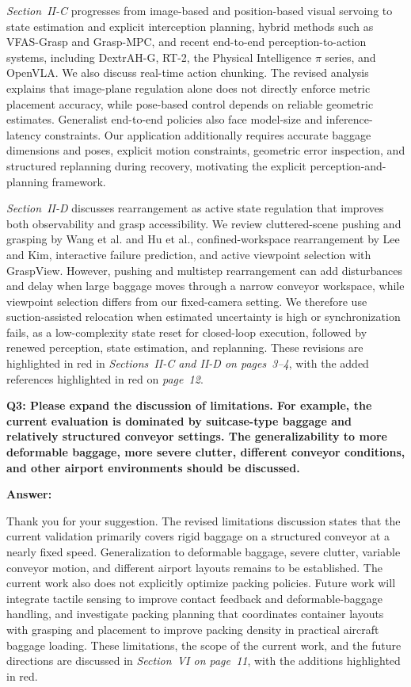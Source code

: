 \documentclass[journal,10pt]{IEEEtran}
\newcommand{\question}[2]{%
  \par\smallskip\noindent
  {\color{responseblue}\bfseries\clubpenalty=10000\widowpenalty=10000 Q#1: #2\par}%
  \par\nobreak\noindent
}
\newcommand{\answer}{%
  \par\smallskip\noindent
  \textbf{Answer: }\ignorespaces
}
\begin{document}
\textit{Section~II-C} progresses from image-based and position-based visual servoing to state estimation and explicit interception planning, hybrid methods such as VFAS-Grasp and Grasp-MPC, and recent end-to-end perception-to-action systems, including DextrAH-G, RT-2, the Physical Intelligence $\pi$ series, and OpenVLA. We also discuss real-time action chunking. The revised analysis explains that image-plane regulation alone does not directly enforce metric placement accuracy, while pose-based control depends on reliable geometric estimates. Generalist end-to-end policies also face model-size and inference-latency constraints. Our application additionally requires accurate baggage dimensions and poses, explicit motion constraints, geometric error inspection, and structured replanning during recovery, motivating the explicit perception-and-planning framework.

\textit{Section~II-D} discusses rearrangement as active state regulation that improves both observability and grasp accessibility. We review cluttered-scene pushing and grasping by Wang et al. and Hu et al., confined-workspace rearrangement by Lee and Kim, interactive failure prediction, and active viewpoint selection with GraspView. However, pushing and multistep rearrangement can add disturbances and delay when large baggage moves through a narrow conveyor workspace, while viewpoint selection differs from our fixed-camera setting. We therefore use suction-assisted relocation when estimated uncertainty is high or synchronization fails, as a low-complexity state reset for closed-loop execution, followed by renewed perception, state estimation, and replanning. These revisions are highlighted in red in \textit{Sections~II-C and II-D on pages~3--4}, with the added references highlighted in red on \textit{page~12}.

\question{3}{Please expand the discussion of limitations. For example, the current evaluation is dominated by suitcase-type baggage and relatively structured conveyor settings. The generalizability to more deformable baggage, more severe clutter, different conveyor conditions, and other airport environments should be discussed.}

\answer
Thank you for your suggestion. The revised limitations discussion states that the current validation primarily covers rigid baggage on a structured conveyor at a nearly fixed speed. Generalization to deformable baggage, severe clutter, variable conveyor motion, and different airport layouts remains to be established. The current work also does not explicitly optimize packing policies. Future work will integrate tactile sensing to improve contact feedback and deformable-baggage handling, and investigate packing planning that coordinates container layouts with grasping and placement to improve packing density in practical aircraft baggage loading. These limitations, the scope of the current work, and the future directions are discussed in \textit{Section~VI on page~11}, with the additions highlighted in red.
\end{document}
